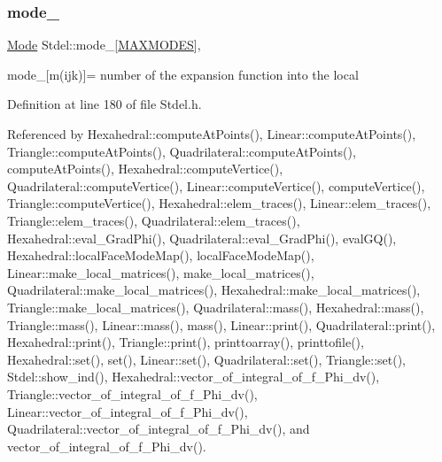 \mbox{\label{classStdel_a7a09cf048f14496813a914ca6afe7366}} 
\subsubsection{\texorpdfstring{mode\+\_\+}{mode\_}}
{\footnotesize\ttfamily \hyperlink{classMode}{Mode} Stdel\+::mode\+\_\+\mbox{[}\hyperlink{MyOptions_8h_aa75ccd382acf88cec3e9c8025c1f88b7}{M\+A\+X\+M\+O\+D\+ES}\mbox{]}\hspace{0.3cm}{\ttfamily [protected]}, {\ttfamily [inherited]}}



mode\+\_\+\mbox{[}m(ijk)\mbox{]}= number of the expansion function into the local 



Definition at line 180 of file Stdel.\+h.



Referenced by Hexahedral\+::compute\+At\+Points(), Linear\+::compute\+At\+Points(), Triangle\+::compute\+At\+Points(), Quadrilateral\+::compute\+At\+Points(), compute\+At\+Points(), Hexahedral\+::compute\+Vertice(), Quadrilateral\+::compute\+Vertice(), Linear\+::compute\+Vertice(), compute\+Vertice(), Triangle\+::compute\+Vertice(), Hexahedral\+::elem\+\_\+traces(), Linear\+::elem\+\_\+traces(), Triangle\+::elem\+\_\+traces(), Quadrilateral\+::elem\+\_\+traces(), Hexahedral\+::eval\+\_\+\+Grad\+Phi(), Quadrilateral\+::eval\+\_\+\+Grad\+Phi(), eval\+G\+Q(), Hexahedral\+::local\+Face\+Mode\+Map(), local\+Face\+Mode\+Map(), Linear\+::make\+\_\+local\+\_\+matrices(), make\+\_\+local\+\_\+matrices(), Quadrilateral\+::make\+\_\+local\+\_\+matrices(), Hexahedral\+::make\+\_\+local\+\_\+matrices(), Triangle\+::make\+\_\+local\+\_\+matrices(), Quadrilateral\+::mass(), Hexahedral\+::mass(), Triangle\+::mass(), Linear\+::mass(), mass(), Linear\+::print(), Quadrilateral\+::print(), Hexahedral\+::print(), Triangle\+::print(), printtoarray(), printtofile(), Hexahedral\+::set(), set(), Linear\+::set(), Quadrilateral\+::set(), Triangle\+::set(), Stdel\+::show\+\_\+ind(), Hexahedral\+::vector\+\_\+of\+\_\+integral\+\_\+of\+\_\+f\+\_\+\+Phi\+\_\+dv(), Triangle\+::vector\+\_\+of\+\_\+integral\+\_\+of\+\_\+f\+\_\+\+Phi\+\_\+dv(), Linear\+::vector\+\_\+of\+\_\+integral\+\_\+of\+\_\+f\+\_\+\+Phi\+\_\+dv(), Quadrilateral\+::vector\+\_\+of\+\_\+integral\+\_\+of\+\_\+f\+\_\+\+Phi\+\_\+dv(), and vector\+\_\+of\+\_\+integral\+\_\+of\+\_\+f\+\_\+\+Phi\+\_\+dv().

